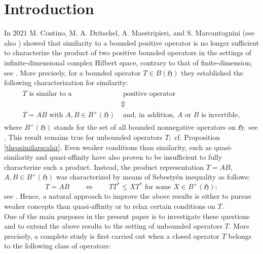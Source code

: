 \documentclass{amsart}
\newcommand{\ifaf}{\Leftrightarrow}
\newcommand{\h}{\mathfrak{H}}
\newcommand{\tstar}{T^{*}}
\newcommand{\lplus}{B^{+}(\h)}
\numberwithin{equation}{section}
\begin{document}
\section{Introduction}
\hspace*{0.3cm} In $2021$   M. Contino, M. A. Dritschel, A. Maestripieri, and S. Marcantognini \cite{product2021} (see also \cite{gustavo2013products}) showed  that similarity to a bounded positive operator is no longer sufficient to characterize the product of two positive bounded operators in the settings of infinite-dimensional complex Hilbert space, contrary to that of finite-dimension; see   \cite{positiveprodmatrices}. More precisely, for a bounded operator $T \in B(\h)$ they established the following characterization for similarity:
 \begin{align} \label{introo1}
\begin{split}
   T \text{ is similar to a}  & \text{ positive operator } \\
    & \Updownarrow \\
       T= AB \text{ with }  A, B \in \lplus & \text{ and, in addition, } A   \text{ or $B$ is invertible},
\end{split}
\end{align}
where $\lplus$ stands for the set of all bounded nonnegative operators on $\h;$ see \cite[Theorem 3.1]{product2021}. This result remains   true for unbounded operators $T;$ cf. Proposition \ref{theosimilarscalar}.
Even weaker conditions than similarity, such as quasi-similarity and quasi-affinity have also proven to be  insufficient  to fully characterize such a product. Instead, the product representation $T=AB,$ $ A,B \in \lplus$ was characterized by means of  Sebestyén inequality
\cite{sebestyen1983restrictions}
 as follows:
 \begin{equation} \label{introo2}
T= A B \qquad \ifaf \qquad   T \tstar \leq X \tstar \text{ for some } X \in \lplus;
\end{equation}
see \cite[Theorem 4.5]{product2021}.
Hence, a natural approach to improve the above results is either to pursue weaker concepts than quasi-affinity or to relax certain conditions on $T.$ \\
 \hspace*{0.4cm} One of the main purposes in the present paper is to investigate these questions and to extend the above results to the setting of unbounded operators $T.$ More precisely, a complete study is first carried out when a closed operator $T$ belongs to the following class of operators:
\end{document}

